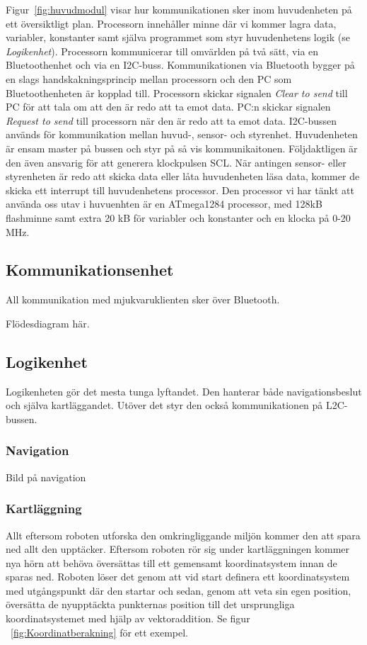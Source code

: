 \documentclass{article}
\begin{document}
Figur~\ref{fig:huvudmodul} visar hur kommunikationen sker inom huvudenheten på ett översiktligt plan. Processorn innehåller minne där vi kommer lagra data, variabler, konstanter samt själva programmet som styr huvudenhetens logik (se \textit{Logikenhet}). Processorn kommunicerar till omvärlden på två sätt, via en Bluetoothenhet och via en I2C-buss. Kommunikationen via Bluetooth bygger på en slags handskakningsprincip mellan processorn och den PC som Bluetoothenheten är kopplad till. Processorn skickar signalen \textit{Clear to send} till PC för att tala om att den är redo att ta emot data. PC:n skickar signalen \textit{Request to send} till processorn när den är redo att ta emot data. I2C-bussen används för kommunikation mellan huvud-, sensor- och styrenhet. Huvudenheten är ensam master på bussen och styr på så vis kommunikaitonen. Följdaktligen är den även ansvarig för att generera klockpulsen SCL. När antingen sensor- eller styrenheten är redo att skicka data eller låta huvudenheten läsa data, kommer de skicka ett interrupt till huvudenhetens processor. Den processor vi har tänkt att använda oss utav i huvuenhten är en ATmega1284 processor, med 128kB flashminne samt extra 20 kB för variabler och konstanter och en klocka på 0-20 MHz.
 
\subsection{Kommunikationsenhet}
All kommunikation med mjukvaruklienten sker över Bluetooth.

Flödesdiagram här.

\subsection{Logikenhet}
Logikenheten gör det mesta tunga lyftandet. Den hanterar både navigationsbeslut och själva kartläggandet. Utöver det styr den också kommunikationen på L2C-bussen.

\subsubsection{Navigation}
Bild på navigation

\subsubsection{Kartläggning}

Allt eftersom roboten utforska den omkringliggande miljön kommer den att spara ned allt den upptäcker. Eftersom roboten rör sig under kartläggningen kommer nya hörn att behöva översättas till ett gemensamt koordinatsystem innan de sparas ned. Roboten löser det genom att vid start definera ett koordinatsystem med utgångspunkt där den startar och sedan, genom att veta sin egen position, översätta de nyupptäckta punkternas position till det ursprungliga koordinatsystemet med hjälp av vektoraddition. Se figur ~\ref{fig:Koordinatberakning} för ett exempel.\newline\newline
\end{document}
